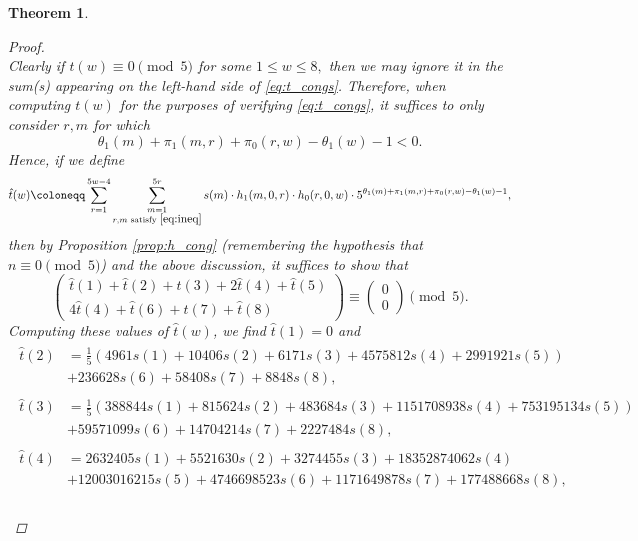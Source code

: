 \documentclass[12pt, reqno]{amsart}
\newtheorem{thm}{Theorem}[section]
\theoremstyle{definition}
\theoremstyle{remark}
\begin{document}
\begin{thm}
\begin{proof}
\begin{equation}
\end{equation}
Clearly if $t(w) \equiv 0 \pmod{5}$ for some $1 \leq w \leq 8,$ then we may ignore it in the sum(s) appearing on the left-hand side of \eqref{eq:t_congs}. Therefore, when computing $t(w)$ for the purposes of verifying \eqref{eq:t_congs}, it suffices to only consider $r,m$ for which 
\begin{equation}\label{eq:ineq}
\theta_1(m)+\pi_1(m,r)+\pi_0(r,w)-\theta_1(w)-1 < 0.
\end{equation}
Hence, if we define 
\[\hat{t}(w) \coloneqq \sum\limits_{r=1}^{5w-4} \sum\limits_{\substack{m=1 \\ r,m \text{ satisfy } \eqref{eq:ineq}}}^{5r} s(m) \cdot h_1(m,0,r) \cdot h_0(r,0,w) \cdot 5^{\theta_1(m) + \pi_1(m,r) + \pi_0(r,w) -\theta_1(w) -1},\]
then by Proposition \ref{prop:h_cong} (remembering the hypothesis that $n \equiv 0 \pmod{5}$) and the above discussion, it suffices to show that 
\[\begin{pmatrix} \hat{t}(1) + \hat{t}(2) + \hat{t}(3) + 2\hat{t}(4) + \hat{t}(5) \\ 4\hat{t}(4) + \hat{t}(6) + \hat{t}(7) + \hat{t}(8) \end{pmatrix} \equiv \begin{pmatrix} 0 \\ 0 \end{pmatrix} \pmod{5}.\]
Computing these values of $\hat{t}(w)$, we find $\hat{t}(1)=0$ and 
\begin{align*}
\begin{split}
\hat{t}(2) &= \frac{1}{5} \left(4961 s(1) + 10406 s(2) + 6171 s(3) + 4575812 s(4) + 2991921 s(5) \right) \\
&+ 236628 s(6) + 58408 s(7) + 8848 s(8),
\end{split} \\
\begin{split} 
\hat{t}(3) &= \frac{1}{5}\left(388844s(1) + 815624 s(2) + 483684 s(3) + 1151708938 s(4) + 753195134 s(5)\right) \\
&+ 59571099 s(6) + 14704214 s(7) + 2227484 s(8), \end{split} \\
\begin{split}
\hat{t}(4) &= 2632405 s(1) + 5521630s(2) + 3274455s(3) + 18352874062s(4) \\
&+ 12003016215s(5) + 4746698523s(6) + 1171649878s(7) + 177488668s(8)   , \end{split} \\
\begin{split} 

\end{split}
\end{align*}
\end{proof}
\end{thm}
\end{document}
